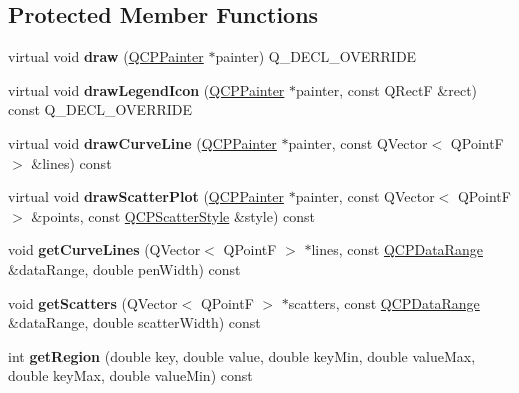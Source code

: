 \subsection*{Protected Member Functions}
\begin{DoxyCompactItemize}
\item 
\mbox{\label{classQCPCurve_ac199d41d23865cd68bd7b598308a4433}} 
virtual void {\bfseries draw} (\hyperlink{classQCPPainter}{Q\+C\+P\+Painter} $\ast$painter) Q\+\_\+\+D\+E\+C\+L\+\_\+\+O\+V\+E\+R\+R\+I\+DE
\item 
\mbox{\label{classQCPCurve_aac6e94afbce4002d2cd7793250154e84}} 
virtual void {\bfseries draw\+Legend\+Icon} (\hyperlink{classQCPPainter}{Q\+C\+P\+Painter} $\ast$painter, const Q\+RectF \&rect) const Q\+\_\+\+D\+E\+C\+L\+\_\+\+O\+V\+E\+R\+R\+I\+DE
\item 
\mbox{\label{classQCPCurve_aa4d7415f7c69eb7820263941f7d88e2c}} 
virtual void {\bfseries draw\+Curve\+Line} (\hyperlink{classQCPPainter}{Q\+C\+P\+Painter} $\ast$painter, const Q\+Vector$<$ Q\+PointF $>$ \&lines) const
\item 
\mbox{\label{classQCPCurve_a0bea811373c5ee8c67c9c2b4d74ad866}} 
virtual void {\bfseries draw\+Scatter\+Plot} (\hyperlink{classQCPPainter}{Q\+C\+P\+Painter} $\ast$painter, const Q\+Vector$<$ Q\+PointF $>$ \&points, const \hyperlink{classQCPScatterStyle}{Q\+C\+P\+Scatter\+Style} \&style) const
\item 
\mbox{\label{classQCPCurve_aefca1e5127fae2d7ff65b9e921637c58}} 
void {\bfseries get\+Curve\+Lines} (Q\+Vector$<$ Q\+PointF $>$ $\ast$lines, const \hyperlink{classQCPDataRange}{Q\+C\+P\+Data\+Range} \&data\+Range, double pen\+Width) const
\item 
\mbox{\label{classQCPCurve_a564c5fdc8409e3532b1322389a8434b8}} 
void {\bfseries get\+Scatters} (Q\+Vector$<$ Q\+PointF $>$ $\ast$scatters, const \hyperlink{classQCPDataRange}{Q\+C\+P\+Data\+Range} \&data\+Range, double scatter\+Width) const
\item 
\mbox{\label{classQCPCurve_a77c89253397c4754b40d4bc8d3e789bf}} 
int {\bfseries get\+Region} (double key, double value, double key\+Min, double value\+Max, double key\+Max, double value\+Min) const

\end{DoxyCompactItemize}
